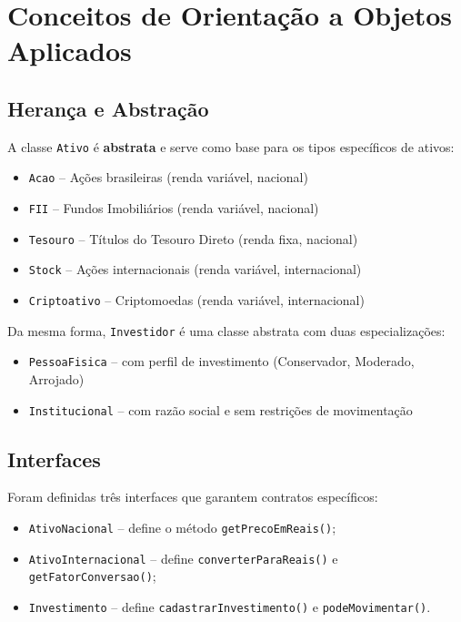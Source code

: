 \documentclass[11pt, a4paper]{article}
\begin{document}
\section{Conceitos de Orientação a Objetos Aplicados}

\subsection{Herança e Abstração}

A classe \texttt{Ativo} é \textbf{abstrata} e serve como base para os tipos específicos de ativos:

\begin{itemize}[noitemsep]
    \item \texttt{Acao} -- Ações brasileiras (renda variável, nacional)
    \item \texttt{FII} -- Fundos Imobiliários (renda variável, nacional)
    \item \texttt{Tesouro} -- Títulos do Tesouro Direto (renda fixa, nacional)
    \item \texttt{Stock} -- Ações internacionais (renda variável, internacional)
    \item \texttt{Criptoativo} -- Criptomoedas (renda variável, internacional)
\end{itemize}

Da mesma forma, \texttt{Investidor} é uma classe abstrata com duas especializações:
\begin{itemize}[noitemsep]
    \item \texttt{PessoaFisica} -- com perfil de investimento (Conservador, Moderado, Arrojado)
    \item \texttt{Institucional} -- com razão social e sem restrições de movimentação
\end{itemize}

\subsection{Interfaces}

Foram definidas três interfaces que garantem contratos específicos:

\begin{itemize}[noitemsep]
    \item \texttt{AtivoNacional} -- define o método \texttt{getPrecoEmReais()};
    \item \texttt{AtivoInternacional} -- define \texttt{converterParaReais()} e \texttt{getFatorConversao()};
    \item \texttt{Investimento} -- define \texttt{cadastrarInvestimento()} e \texttt{podeMovimentar()}.
\end{itemize}
\end{document}
